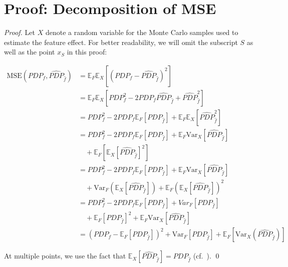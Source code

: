 \documentclass[runningheads]{llncs}
\begin{document}
%



\newpage
\appendix
\section{Proof: Decomposition of MSE}\label{app:proof-mse-decomposition}

\begin{proof}
    Let $X$ denote a random variable for the Monte Carlo samples used to estimate the feature effect.
    For better readability, we will omit the subscript $S$ as well as the point $x_S$ in this proof:

    \begin{align*}
        \text{MSE}(PDP_{f}, \widehat{PDP}_{\hat f})
         & = \mathbb{E}_F\mathbb{E}_X[{(PDP_f - \widehat{PDP}_{\hat f})}^2]                                                             \\
         & = \mathbb{E}_F \mathbb{E}_X[PDP_f^2 - 2PDP_f\widehat{PDP}_{\hat f} + \widehat{PDP}_{\hat f}^2]                               \\
         & = PDP_f^2 - 2PDP_f\mathbb{E}_F[PDP_{\hat f}] + \mathbb{E}_F\mathbb{E}_X[\widehat{PDP}_{\hat f}^2]                            \\
         & = PDP_f^2 - 2PDP_f\mathbb{E}_F[PDP_{\hat f}] + \mathbb{E}_F\text{Var}_X[\widehat{PDP}_{\hat f}]                              \\
         & \quad + \mathbb{E}_F[\mathbb{E}_X{[\widehat{PDP}_{\hat f}]}^2]                                                               \\
         & = PDP_f^2 - 2PDP_f\mathbb{E}_F[PDP_{\hat f}] + \mathbb{E}_F\text{Var}_X[\widehat{PDP}_{\hat f}]                              \\
         & \quad + \text{Var}_F(\mathbb{E}_X[\widehat{PDP}_{\hat f}]) + \mathbb{E}_F{(\mathbb{E}_X[\widehat{PDP}_{\hat f}])}^2          \\
         & = PDP_f^2 - 2PDP_f\mathbb{E}_F[PDP_{\hat f}] +  Var_F[PDP_{\hat f}]                                                          \\
         & \quad + \mathbb{E}_F{[PDP_{\hat f}]}^2 + \mathbb{E}_F\text{Var}_X[\widehat{PDP}_{\hat f}]                                    \\
         & = {(PDP_f - \mathbb{E}_F[PDP_{\hat f}])}^2 + \text{Var}_F[PDP_{\hat f}] + \mathbb{E}_F[\text{Var}_X(\widehat{PDP}_{\hat f})]
    \end{align*}

    \noindent At multiple points, we use the fact that $\mathbb{E}_X[\widehat{PDP}_{\hat f}]
        = PDP_{\hat f}$ (cf.~\cite{molnar_relating_2023}).
    \qed\
\end{proof}
\end{document}
